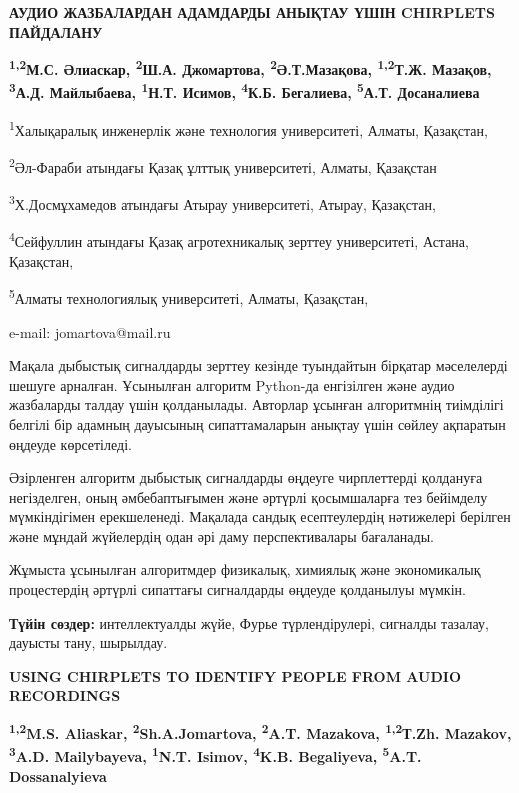 \begin{articleheader}
{\bfseries АУДИО ЖАЗБАЛАРДАН АДАМДАРДЫ АНЫҚТАУ ҮШІН CHIRPLETS ПАЙДАЛАНУ}

{\bfseries
\textsuperscript{1,2}М.С. Әлиаскар,
\textsuperscript{2}Ш.А. Джомартова\textsuperscript{\envelope },
\textsuperscript{2}Ә.Т.Мазақова,
\textsuperscript{1,2}Т.Ж. Мазақов,
\textsuperscript{3}А.Д. Майлыбаева,
\textsuperscript{1}Н.Т. Исимов,
\textsuperscript{4}К.Б. Бегалиева,
\textsuperscript{5}А.Т. Досаналиева
}
\end{articleheader}

\begin{affiliation}
\textsuperscript{1}Халықаралық инженерлік және технология университеті, Алматы, Қазақстан,

\textsuperscript{2}Әл-Фараби атындағы Қазақ ұлттық университеті, Алматы, Қазақстан

\textsuperscript{3}Х.Досмұхамедов атындағы Атырау университеті, Атырау, Қазақстан,

\textsuperscript{4}Сейфуллин атындағы Қазақ агротехникалық зерттеу университеті, Астана, Қазақстан,

\textsuperscript{5}Алматы технологиялық университеті, Алматы, Қазақстан,

e-mail: jomartova@mail.ru
\end{affiliation}

Мақала дыбыстық сигналдарды зерттеу кезінде туындайтын бірқатар
мәселелерді шешуге арналған. Ұсынылған алгоритм Python-да енгізілген
және аудио жазбаларды талдау үшін қолданылады. Авторлар ұсынған
алгоритмнің тиімділігі белгілі бір адамның дауысының сипаттамаларын
анықтау үшін сөйлеу ақпаратын өңдеуде көрсетіледі.

Әзірленген алгоритм дыбыстық сигналдарды өңдеуге чирплеттерді қолдануға
негізделген, оның әмбебаптығымен және әртүрлі қосымшаларға тез бейімделу
мүмкіндігімен ерекшеленеді. Мақалада сандық есептеулердің нәтижелері
берілген және мұндай жүйелердің одан әрі даму перспективалары
бағаланады.

Жұмыста ұсынылған алгоритмдер физикалық, химиялық және экономикалық
процестердің әртүрлі сипаттағы сигналдарды өңдеуде қолданылуы мүмкін.

{\bfseries Түйін сөздер:} интеллектуалды жүйе, Фурье түрлендірулері,
сигналды тазалау, дауысты тану, шырылдау.

\begin{articleheader}
{\bfseries USING CHIRPLETS TO IDENTIFY PEOPLE FROM AUDIO RECORDINGS}

{\bfseries
\textsuperscript{1,2}M.S. Aliaskar,
\textsuperscript{2}Sh.A.Jomartova\textsuperscript{\envelope },
\textsuperscript{2}A.T. Mazakova,
\textsuperscript{1,2}Т.Zh. Mazakov,
\textsuperscript{3}A.D. Mailybayeva,
\textsuperscript{1}N.T. Isimov,
\textsuperscript{4}K.B. Begaliyeva,
\textsuperscript{5}A.T. Dossanalyieva
}
\end{articleheader}

